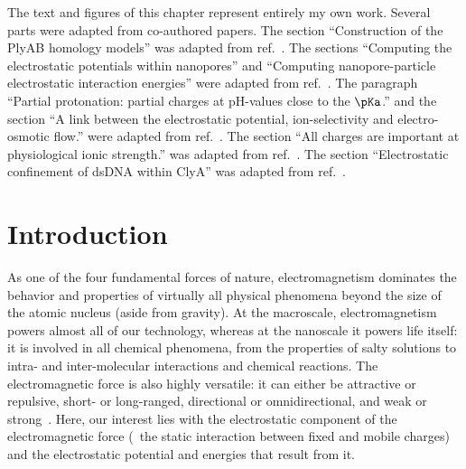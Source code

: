 %
The text and figures of this chapter represent entirely my own work. Several parts were adapted from
co-authored papers.
%
The section
%
``Construction of the PlyAB homology models''
%
was adapted from ref.~\cite{Huang-2020}.
%
%
The sections
%
``Computing the electrostatic potentials within nanopores''
%
and
%
``Computing nanopore-particle electrostatic interaction energies''
%
were adapted from ref.~\cite{Willems-Ruic-Biesemans-2019}.
%
%
The paragraph
%
``Partial protonation: partial charges at pH-values close to the $\pKa$.''
%
and the section
%
``A link between the electrostatic potential, ion-selectivity and electro-osmotic flow.''
%
were adapted from ref.~\cite{Huang-2017}.
%
The section
%
``All charges are important at physiological ionic strength.''
%
was adapted from ref.~\cite{Franceschini-2016}.
%
%
The section
%
``Electrostatic confinement of {dsDNA} within {ClyA}''
%
was adapted from ref.~\cite{Bayoumi-2020}.
%

%
%
%
%





%
\section{Introduction}
%
\label{sec:elec:intro}
%

As one of the four fundamental forces of nature, electromagnetism dominates the behavior and properties of
virtually all physical phenomena beyond the size of the atomic nucleus (aside from gravity). At the
macroscale, electromagnetism powers almost all of our technology, whereas at the nanoscale it powers life
itself: it is involved in all chemical phenomena, from the properties of salty solutions to intra- and
inter-molecular interactions and chemical reactions. The electromagnetic force is also highly versatile: it
can either be attractive or repulsive, short- or long-ranged, directional or omnidirectional, and weak or
strong~\cite{Walker-2011}. Here, our interest lies with the electrostatic component of the electromagnetic
force (\ie~the static interaction between fixed and mobile charges) and the electrostatic potential and
energies that result from it.

